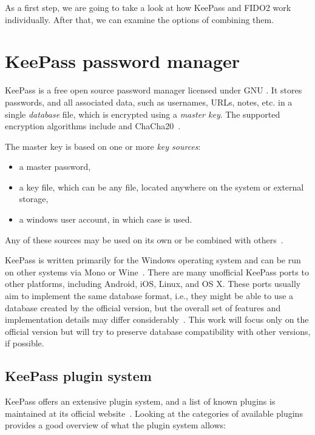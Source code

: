 As a first step, we are going to take a look at how KeePass and FIDO2
work individually. After that, we can examine the options of combining them.

\section{KeePass password manager}\label{section:keepass-password-manager}

KeePass is a free open source password manager licensed under GNU .
It stores passwords, and all associated data, such as usernames, URLs, notes, etc. in a single \emph{\gls{database}} file,
which is encrypted using a \emph{\gls{master key}}. The supported encryption algorithms include  and ChaCha20~\cite{keepass:home}.

The \gls{master key} is based on one or more \emph{\glspl{key source}}:

\begin{itemize}
	\item a master password,
	\item a key file, which can be any file, located anywhere on the system or external storage,
	\item a windows user account, in which case  is used.
\end{itemize}

Any of these sources may be used on its own or be combined with others~\cite{keepass:keys}.

KeePass is written primarily for the Windows operating system and can be run on other systems
via Mono or Wine~\cite{keepass:setup}. There are many unofficial KeePass ports to other platforms, including
Android, iOS, Linux, and OS X. These ports usually aim to implement the same database format,
i.e., they might be able to use a database created by the official version, but the overall
set of features and implementation details may differ considerably~\cite{keepass:download}. This work will focus only on the official version
but will try to preserve database compatibility with other versions, if possible.

\subsection{KeePass plugin system}\label{subsec:keepass-plugin-system}

KeePass offers an extensive plugin system, and a list of known plugins is maintained at its official website~\cite{keepass:plugins}.
Looking at the categories of available plugins provides a good overview of what the plugin system allows:

